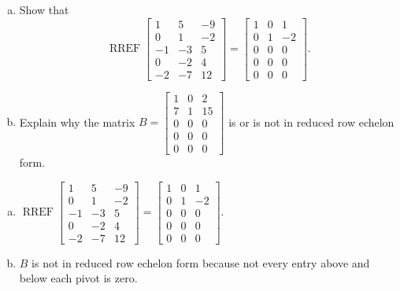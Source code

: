 
\begin{exerciseStatement}

\begin{enumerate}[(a)]
\item Show that \[\operatorname{RREF} \left[\begin{array}{ccc}
1 & 5 & -9 \\
0 & 1 & -2 \\
-1 & -3 & 5 \\
0 & -2 & 4 \\
-2 & -7 & 12
\end{array}\right] = \left[\begin{array}{ccc}
1 & 0 & 1 \\
0 & 1 & -2 \\
0 & 0 & 0 \\
0 & 0 & 0 \\
0 & 0 & 0
\end{array}\right] .\]
\item Explain why the matrix \(B= \left[\begin{array}{ccc}
1 & 0 & 2 \\
7 & 1 & 15 \\
0 & 0 & 0 \\
0 & 0 & 0 \\
0 & 0 & 0
\end{array}\right] \) is or is not in reduced row echelon form.
\end{enumerate}
    
\end{exerciseStatement}
    
\begin{exerciseAnswer} 

\begin{enumerate}[(a)]
\item \(\operatorname{RREF} \left[\begin{array}{ccc}
1 & 5 & -9 \\
0 & 1 & -2 \\
-1 & -3 & 5 \\
0 & -2 & 4 \\
-2 & -7 & 12
\end{array}\right] = \left[\begin{array}{ccc}
1 & 0 & 1 \\
0 & 1 & -2 \\
0 & 0 & 0 \\
0 & 0 & 0 \\
0 & 0 & 0
\end{array}\right] .\)
\item \(B\) is not in reduced row echelon form because not every entry above and below each pivot is zero. 
\end{enumerate}
    
\end{exerciseAnswer}
    
